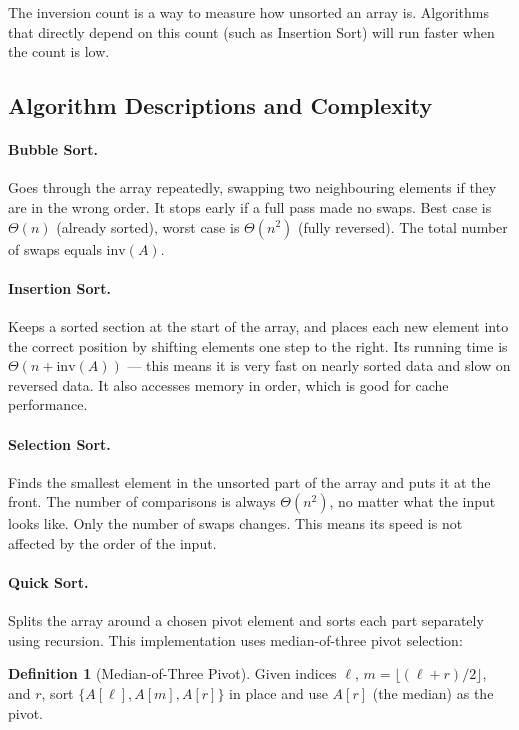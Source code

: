 \documentclass[12pt,a4paper]{article}
\theoremstyle{definition}
\newtheorem{definition}{Definition}[section]
\begin{document}
The inversion count is a way to measure how unsorted an array is. Algorithms that directly depend on this count (such as Insertion Sort) will run faster when the count is low.

\subsection{Algorithm Descriptions and Complexity}

\paragraph{Bubble Sort.}
Goes through the array repeatedly, swapping two neighbouring elements if they are in the wrong order. It stops early if a full pass made no swaps. Best case is $\Theta(n)$ (already sorted), worst case is $\Theta(n^2)$ (fully reversed). The total number of swaps equals $\text{inv}(A)$.

\paragraph{Insertion Sort.}
Keeps a sorted section at the start of the array, and places each new element into the correct position by shifting elements one step to the right. Its running time is $\Theta(n + \text{inv}(A))$ --- this means it is very fast on nearly sorted data and slow on reversed data. It also accesses memory in order, which is good for cache performance.

\paragraph{Selection Sort.}
Finds the smallest element in the unsorted part of the array and puts it at the front. The number of comparisons is always $\Theta(n^2)$, no matter what the input looks like. Only the number of swaps changes. This means its speed is not affected by the order of the input.

\paragraph{Quick Sort.}
Splits the array around a chosen pivot element and sorts each part separately using recursion. This implementation uses median-of-three pivot selection:

\begin{definition}[Median-of-Three Pivot]\cite{sedgewick2011}
Given indices $\ell$, $m = \lfloor(\ell + r)/2\rfloor$, and $r$, sort $\{A[\ell], A[m], A[r]\}$ in place and use $A[r]$ (the median) as the pivot.
\end{definition}
\end{document}
